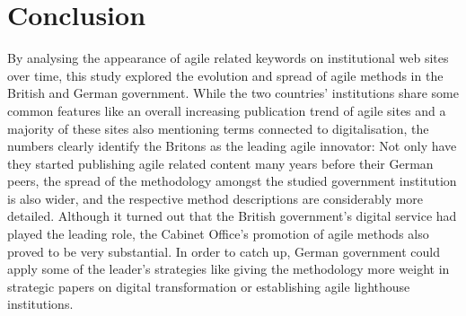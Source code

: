 \section{Conclusion}\label{Conclusion}
By analysing the appearance of agile related keywords on institutional web sites over time, this study explored the evolution and spread of agile methods in the British and German government. While the two countries' institutions share some common features like an overall increasing publication trend of agile sites and a majority of these sites also mentioning terms connected to digitalisation, the numbers clearly identify the Britons as the leading agile innovator: Not only have they started publishing agile related content many years before their German peers, the spread of the methodology amongst the studied government institution is also wider, and the respective method descriptions are considerably more detailed. Although it turned out that the British government's digital service had played the leading role, the Cabinet Office's promotion of agile methods also proved to be very substantial. In order to catch up, German government could apply some of the leader's strategies like giving the methodology more weight in strategic papers on digital transformation or establishing agile lighthouse institutions.